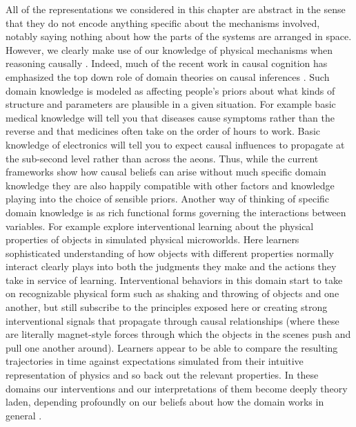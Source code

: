\documentclass{cambridge7A}%
\begin{document}
All of the representations we considered in this chapter are abstract in the sense that they do not encode anything specific about the mechanisms involved, notably saying nothing about how the parts of the systems are arranged in space.  However, we clearly make use of our knowledge of physical mechanisms when reasoning causally \citep{ahn1995role,bramley2017physics}.  Indeed, much of the recent work in causal cognition has emphasized the top down role of domain theories on causal inferences \citep{griffiths2009theory,griffiths2005causes,lake2015human}.  Such domain knowledge is modeled as affecting people's priors about what kinds of structure and parameters are plausible in a given situation.  For example basic medical knowledge will tell you that diseases cause symptoms rather than the reverse and that medicines often take on the order of hours to work.  Basic knowledge of electronics will tell you to expect causal influences to propagate at the sub-second level rather than across the aeons.  Thus, while the current frameworks show how causal beliefs can arise without much specific domain knowledge they are also happily compatible with other factors and knowledge playing into the choice of sensible priors.  Another way of thinking of specific domain knowledge is as rich functional forms governing the interactions between variables.  For example \cite{bramley2017physics} explore interventional learning about the physical properties of objects in simulated physical microworlds.  Here learners sophisticated understanding of how objects with different properties normally interact clearly plays into both the judgments they make and the actions they take in service of learning.  Interventional behaviors in this domain start to take on recognizable physical form such as shaking and throwing of objects and one another, but still subscribe to the principles exposed here or creating strong interventional signals that propagate through causal relationships (where these are literally magnet-style forces  through which the objects in the scenes push and pull one another around).  Learners appear to be able to compare the resulting trajectories in time against expectations simulated from their intuitive representation of physics and so back out the relevant properties.  In these domains our interventions and our interpretations of them become deeply theory laden, depending profoundly on our beliefs about how the domain works in general \citep{bramley2017neurath}.
\end{document}

